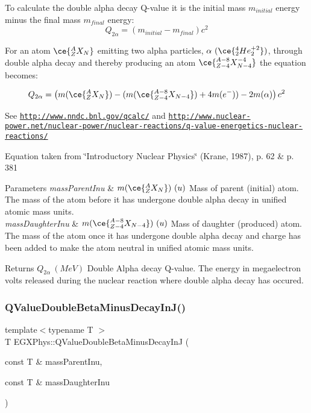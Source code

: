To calculate the double alpha decay Q-\/value it is the initial mass $m_{initial}$ energy minus the final mass $m_{final}$ energy\+: \[Q_{2\alpha} = \left ( m_{initial}-m_{final}\right ) c^2\]

For an atom $\ce{ ^{A}_{Z}X_{N} }$ emitting two alpha particles, $\alpha\ (\ce{ ^{4}_{2}He^{+2}_{2} })$, through double alpha decay and thereby producing an atom $\ce{ ^{A-8}_{Z{-4}}X^{-4}_{N-4} }$ the equation becomes\+:

\[Q_{2\alpha} = \left ( m(\ce{ ^{A}_{Z}X_{N} }) - (m(\ce{ ^{A-8}_{Z{-4}}X_{N-4} }) + 4m(e^-)) - 2m(\alpha)\right ) c^2\]

See \href{http://www.nndc.bnl.gov/qcalc/}{\tt http\+://www.\+nndc.\+bnl.\+gov/qcalc/} and \href{http://www.nuclear-power.net/nuclear-power/nuclear-reactions/q-value-energetics-nuclear-reactions/}{\tt http\+://www.\+nuclear-\/power.\+net/nuclear-\/power/nuclear-\/reactions/q-\/value-\/energetics-\/nuclear-\/reactions/}

Equation taken from \char`\"{}\+Introductory Nuclear Physics\char`\"{} (Krane, 1987), p. 62 \& p. 381


\begin{DoxyParams}{Parameters}
{\em mass\+Parent\+Inu} & $m(\ce{ ^{A}_{Z}X_{N} })\ (u)$ Mass of parent (initial) atom. The mass of the atom before it has undergone double alpha decay in unified atomic mass units. \\
\hline
{\em mass\+Daughter\+Inu} & $m(\ce{ ^{A-8}_{Z{-4}}X_{N-4} })\ (u)$ Mass of daughter (produced) atom. The mass of the atom once it has undergone double alpha decay and charge has been added to make the atom neutral in unified atomic mass units. \\
\hline
\end{DoxyParams}
\begin{DoxyReturn}{Returns}
$Q_{2\alpha}\ (MeV)$ Double Alpha decay Q-\/value. The energy in megaelectron volts released during the nuclear reaction where double alpha decay has occured. 
\end{DoxyReturn}
\mbox{\label{group___e_g_x_phys-_q_value_gaf19d189152aec04d8b1ebbbe8792540b}} 
\subsubsection{\texorpdfstring{Q\+Value\+Double\+Beta\+Minus\+Decay\+In\+J()}{QValueDoubleBetaMinusDecayInJ()}}
{\footnotesize\ttfamily template$<$typename T $>$ \\
T E\+G\+X\+Phys\+::\+Q\+Value\+Double\+Beta\+Minus\+Decay\+InJ (\begin{DoxyParamCaption}\item[{const T \&}]{mass\+Parent\+Inu,  }\item[{const T \&}]{mass\+Daughter\+Inu }\end{DoxyParamCaption})}



